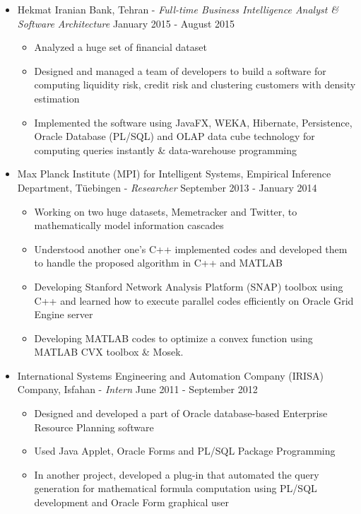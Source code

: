 \documentclass[letter]{res}
\begin{document}
\begin{resume}
\begin{itemize}[leftmargin=-.1in]
  \item Hekmat Iranian Bank, Tehran \newline
   - {\sl Full-time Business Intelligence Analyst \& Software Architecture} \hfill January 2015 - August 2015\\
  \vspace{-4mm}
  \iflong
    \begin{itemize}
        \item Analyzed a huge set of financial dataset
        \item Designed and managed a team of developers to build a software for computing liquidity risk, credit risk and clustering customers with density estimation
        \item Implemented the software using JavaFX, WEKA, Hibernate, Persistence, Oracle Database (PL/SQL) and OLAP data cube technology for computing queries instantly \& data-warehouse programming
    \end{itemize}
  \fi
  
  \item Max Planck Institute (MPI) for Intelligent Systems, Empirical Inference Department, Tüebingen \newline
  - {\sl Researcher} \hfill September 2013 - January 2014\\
    \vspace{-4mm}
    \iflong
      \begin{itemize}
          \item Working on two huge datasets, Memetracker and Twitter, to mathematically model information cascades
          \item Understood another one's C++ implemented codes and developed them to handle the proposed algorithm in C++ and MATLAB
          \item Developing Stanford Network Analysis Platform (SNAP) toolbox using C++ and learned how to execute parallel codes efficiently on Oracle Grid Engine server
          \item Developing MATLAB codes to optimize a convex function using MATLAB CVX toolbox \& Mosek.
      \end{itemize}
    \fi
  
  \item International Systems Engineering and Automation Company (IRISA) Company, Isfahan \newline
- {\sl Intern} \hfill June 2011 - September 2012\\
	\vspace{-4mm}
    \iflong
      \begin{itemize}
          \item Designed and developed a part of Oracle database-based Enterprise Resource Planning software
          \item Used Java Applet, Oracle Forms and PL/SQL Package Programming
          \item In another project, developed a plug-in that automated the query generation for mathematical formula computation using PL/SQL development and Oracle Form graphical user
      \end{itemize}
    \fi


\end{itemize}
\end{resume}
\end{document}
